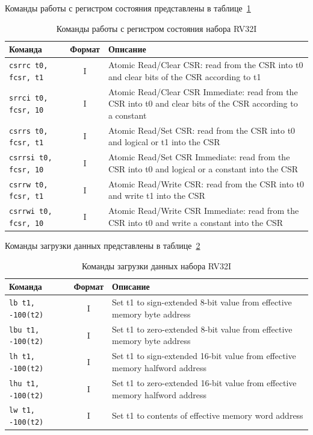 Команды работы с регистром состояния представлены в таблице~\ref{table-base-env}

\begin{table}[h]
    \caption{Команды работы с регистром состояния набора RV32I}
    \centering
    \begin{tabularx}{\textwidth}{|l|c|X|}
        \hline
        \textbf{Команда} & \textbf{Формат} & \textbf{Описание} \\
        \hline \verb|csrrc t0, fcsr, t1| & I & Atomic Read/Clear CSR: read from the CSR into t0 and clear bits of the CSR according to t1 \\
        \hline \verb|srrci t0, fcsr, 10| & I & Atomic Read/Clear CSR Immediate: read from the CSR into t0 and clear bits of the CSR according to a constant \\
        \hline \verb|csrrs t0, fcsr, t1| & I & Atomic Read/Set CSR: read from the CSR into t0 and logical or t1 into the CSR \\
        \hline \verb|csrrsi t0, fcsr, 10| & I & Atomic Read/Set CSR Immediate: read from the CSR into t0 and logical or a constant into the CSR \\
        \hline \verb|csrrw t0, fcsr, t1| & I & Atomic Read/Write CSR: read from the CSR into t0 and write t1 into the CSR \\
        \hline \verb|csrrwi t0, fcsr, 10| & I & Atomic Read/Write CSR Immediate: read from the CSR into t0 and write a constant into the CSR \\
        \hline
    \end{tabularx}
    \label{table-base-env}
\end{table}

Команды загрузки данных представлены в таблице~\ref{table-base-load}

\begin{table}[h]
    \caption{Команды загрузки данных набора RV32I}
    \centering
    \begin{tabularx}{\textwidth}{|l|c|X|}
        \hline
        \textbf{Команда} & \textbf{Формат} & \textbf{Описание} \\
        \hline \verb|lb t1, -100(t2)| & I & Set t1 to sign-extended 8-bit value from effective memory byte address \\
        \hline \verb|lbu t1, -100(t2)| & I & Set t1 to zero-extended 8-bit value from effective memory byte address \\
        \hline \verb|lh t1, -100(t2)| & I & Set t1 to sign-extended 16-bit value from effective memory halfword address \\
        \hline \verb|lhu t1, -100(t2)| & I & Set t1 to zero-extended 16-bit value from effective memory halfword address \\
        \hline \verb|lw t1, -100(t2)| & I & Set t1 to contents of effective memory word address \\
        \hline
    \end{tabularx}
    \label{table-base-load}
\end{table}

